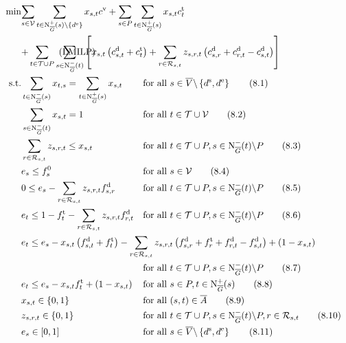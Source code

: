 \begin{align}
	\min & \omit\rlap{$\displaystyle{\sum_{s\in\mathcal{V}} \sum_{t\in\Nouto(s)\backslash\{d^{\operatorname{e}}\}} x_{s,t}\cv + \sum_{s\in P}\sum_{t\in\Nouto(s)} x_{s,t} \ct_t}$} \nonumber \\
	& \omit\rlap{$\displaystyle{ + \sum_{t\in\mathcal{T}\cup P} \sum_{s\in\Nino(t)} \left[x_{s,t}\left(\cd_{s,t}+\ct_t\right) + \sum_{r\in\Rst} z_{s,r,t}\left(\cd_{s,r}+\cd_{r,t}-\cd_{s,t}\right)\right]}$} \tag{LMILP} \label{eq:Knoll:LMILP} \\
	\text{s.t.} & \sum_{t\in\Nino(s)} x_{t,s} = \sum_{t\in\Nouto(s)} x_{s,t} & & \text{for all } s\in \overline{V}\backslash\left\{d^{\operatorname{s}},d^{\operatorname{e}}\right\} \tag{8.1} \\
	& \sum_{s\in\Nino(t)} x_{s,t} = 1 & & \text{for all } t\in\mathcal{T}\cup\mathcal{V} \tag{8.2} \\
	& \sum_{r\in\Rst} z_{s,r,t} \leq x_{s,t} & & \text{for all } t\in\mathcal{T}\cup P, s\in\Nino(t)\backslash P \tag{8.3} \\
	& e_s \leq f_s^0 & & \text{for all } s\in\mathcal{V} \tag{8.4} \\
	& 0 \leq e_s - \sum_{r\in\Rst} z_{s,r,t}\fd_{s,r} & & \text{for all } t\in\mathcal{T}\cup P, s\in\Nino(t)\backslash P \tag{8.5} \\
	& e_t \leq 1 - \ft_t - \sum_{r\in\Rst} z_{s,r,t}\fd_{r,t} & & \text{for all } t\in\mathcal{T}\cup P, s\in\Nino(t)\backslash P \tag{8.6} \\
	& \omit\rlap{$\displaystyle{e_t \leq e_s - x_{s,t}\left(f_{s,t}^{\operatorname{d}}+f_t^{\operatorname{t}}\right) - \sum_{r\in\Rst} z_{s,r,t}\left(\fd_{s,r}+\ft_r+\fd_{r,t}-\fd_{s,t}\right) + \left(1-x_{s,t}\right)}$} \nonumber \\
	& & & \text{for all } t\in\mathcal{T}\cup P, s\in\Nino(t)\backslash P \tag{8.7} \\
	& e_t \leq e_s-x_{s,t}\ft_t+\left(1-x_{s,t}\right) && \text{for all } s\in P,t\in\Nouto(s) \tag{8.8} \\
	& x_{s,t}\in\{0,1\} & & \text{for all } (s,t)\in\overline{A} \tag{8.9}\\
	& z_{s,r,t}\in\{0,1\} & & \text{for all } t\in\mathcal{T}\cup P,s\in\Nino(t)\backslash P,r\in\Rst \tag{8.10} \\
	& e_s\in[0,1] & & \text{for all } s\in\overline{V}\backslash\left\{d^{\operatorname{s}},d^{\operatorname{e}}\right\} \tag{8.11}
\end{align}

